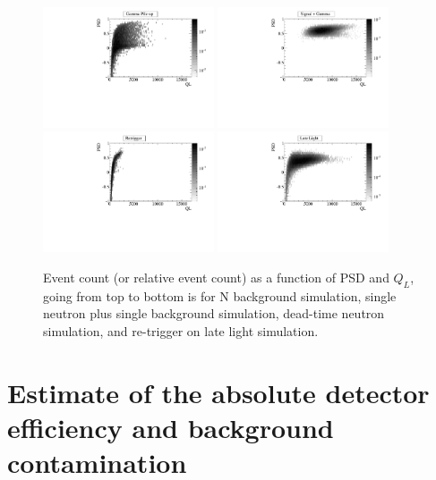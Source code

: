 \documentclass[review]{elsarticle}
\begin{document}
\begin{figure}[!htpb]
\centering
\includegraphics[width=0.45\textwidth]{figures/hbgpile_psdql.pdf}
\includegraphics[width=0.45\textwidth]{figures/hsigbg_psdql.pdf}
\includegraphics[width=0.45\textwidth]{figures/hretrig_psdql.pdf}
\includegraphics[width=0.45\textwidth]{figures/hlate_psdql.pdf}
\caption{ Event count (or relative event count) as a function of PSD
  and $Q_L$, going from top to bottom is for N background simulation,
  single neutron plus single background simulation, dead-time neutron
  simulation, and re-trigger on late light simulation.}
\label{fig:eventSpectra2}
\end{figure}


\section{Estimate of the absolute detector efficiency and background contamination}\label{sec:eff}
\end{document}
